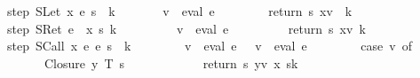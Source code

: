 \begin{isabellebody}
\ \ {\isachardoublequoteopen}step\ {\isacharparenleft}SLet\ x\ e\ s{\isacharcomma}\ {\isasymrho}{\isacharcomma}\ k{\isacharcomma}\ {\isasymmu}{\isacharcomma}\ {\isacharbrackleft}{\isacharbrackright}{\isacharparenright}\ {\isacharequal}\isanewline
\ \ \ \ {\isacharparenleft}v\ {\isacharcolon}{\isacharequal}\ eval\ e\ {\isasymrho}\ {\isasymmu}{\isacharsemicolon}\ \isanewline
\ \ \ \ \ return\ {\isacharparenleft}s{\isacharcomma}\ {\isacharparenleft}x{\isacharcomma}v{\isacharparenright}{\isacharhash}{\isasymrho}\ {\isacharcomma}\ k{\isacharcomma}\ {\isasymmu}{\isacharcomma}\ {\isacharbrackleft}{\isacharbrackright}{\isacharparenright}{\isacharparenright}{\isachardoublequoteclose}\ {\isacharbar}\isanewline
\ \ {\isachardoublequoteopen}step\ {\isacharparenleft}SRet\ e{\isacharcomma}\ {\isasymrho}{\isacharcomma}\ {\isacharparenleft}x{\isacharcomma}\ s{\isacharcomma}\ {\isasymrho}{\isacharprime}{\isacharparenright}{\isacharhash}k{\isacharcomma}\ {\isasymmu}{\isacharcomma}\ {\isacharbrackleft}{\isacharbrackright}{\isacharparenright}\ {\isacharequal}\isanewline
\ \ \ \ \ \ {\isacharparenleft}v\ {\isacharcolon}{\isacharequal}\ eval\ e\ {\isasymrho}\ {\isasymmu}{\isacharsemicolon}\isanewline
\ \ \ \ \ \ \ return\ {\isacharparenleft}s{\isacharcomma}\ {\isacharparenleft}x{\isacharcomma}v{\isacharparenright}{\isacharhash}{\isasymrho}{\isacharprime}{\isacharcomma}\ k{\isacharcomma}\ {\isasymmu}{\isacharcomma}\ {\isacharbrackleft}{\isacharbrackright}{\isacharparenright}{\isacharparenright}{\isachardoublequoteclose}\ {\isacharbar}\isanewline
\ \ {\isachardoublequoteopen}step\ {\isacharparenleft}SCall\ x\ e{}\ e{}\ s{\isacharcomma}\ {\isasymrho}{\isacharcomma}\ k{\isacharcomma}\ {\isasymmu}{\isacharcomma}\ {\isacharbrackleft}{\isacharbrackright}{\isacharparenright}\ {\isacharequal}\isanewline
\ \ \ \ \ {\isacharparenleft}v{}\ {\isacharcolon}{\isacharequal}\ eval\ e{}\ {\isasymrho}\ {\isasymmu}{\isacharsemicolon}\ v{}\ {\isacharcolon}{\isacharequal}\ eval\ e{}\ {\isasymrho}\ {\isasymmu}{\isacharsemicolon}\isanewline
\ \ \ \ \ \ case\ v{}\ of\isanewline
\ \ \ \ \ \ \ \ Closure\ y\ T\ s{\isacharprime}\ {\isasymrho}{\isacharprime}\ {\isasymRightarrow}\isanewline
\ \ \ \ \ \ \ \ \ \ return\ {\isacharparenleft}s{\isacharprime}{\isacharcomma}\ {\isacharparenleft}y{\isacharcomma}v{}{\isacharparenright}{\isacharhash}{\isasymrho}{\isacharprime}{\isacharcomma}\ {\isacharparenleft}x{\isacharcomma}\ s{\isacharcomma}{\isasymrho}{\isacharparenright}{\isacharhash}k{\isacharcomma}\ {\isasymmu}{\isacharcomma}\ {\isacharbrackleft}{\isacharbrackright}{\isacharparenright}\isanewline

\end{isabellebody}
